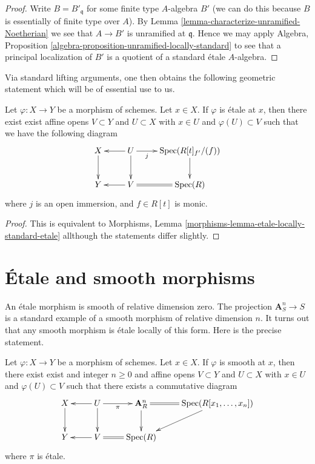\begin{proof}
Write $B = B'_{\mathfrak q}$ for some finite type $A$-algebra $B'$
(we can do this because $B$ is essentially of finite type over $A$).
By Lemma \ref{lemma-characterize-unramified-Noetherian}
we see that $A \to B'$ is unramified at $\mathfrak q$.
Hence we may apply
Algebra, Proposition \ref{algebra-proposition-unramified-locally-standard}
to see that a principal localization of $B'$ is a quotient of a
standard \'etale $A$-algebra.
\end{proof}

\noindent
Via standard lifting arguments, one then obtains the following geometric
statement which will be of essential use to us.

\begin{theorem}
\label{theorem-geometric-structure}
Let $\varphi : X \to Y$ be a morphism of schemes.
Let $x \in X$.
If $\varphi$ is \'etale at $x$, then there exist exist affine opens
$V \subset Y$ and $U \subset X$ with $x \in U$ and $\varphi(U) \subset V$
such that we have the following diagram
$$
\xymatrix{
X \ar[d] & U \ar[l] \ar[d] \ar[r]_-j & \text{Spec}(R[t]_{f'}/(f)) \ar[d] \\
Y & V \ar[l] \ar@{=}[r] & \text{Spec}(R)
}
$$
where $j$ is an open immersion, and $f \in R[t]$ is monic.
\end{theorem}

\begin{proof}
This is equivalent to
Morphisms, Lemma \ref{morphisms-lemma-etale-locally-standard-etale}
allthough the statements differ slightly.
\end{proof}


\section{\'Etale and smooth morphisms}
\label{section-etale-smooth}

\noindent
An \'etale morphism is smooth of relative dimension zero.
The projection $\mathbf{A}^n_S \to S$ is a standard example
of a smooth morphism of relative dimension $n$.
It turns out that any smooth morphism is \'etale locally
of this form. Here is the precise statement.

\begin{theorem}
\label{theorem-smooth-etale-over-n-space}
Let $\varphi : X \to Y$ be a morphism of schemes.
Let $x \in X$.
If $\varphi$ is smooth at $x$, then
there exist exist and integer $n \geq 0$ and affine opens
$V \subset Y$ and $U \subset X$ with $x \in U$ and $\varphi(U) \subset V$
such that there exists a commutative diagram
$$
\xymatrix{
X \ar[d] & U \ar[l] \ar[d] \ar[r]_-\pi &
\mathbf{A}^n_R \ar[d] \ar@{=}[r] &  \text{Spec}(R[x_1, \ldots, x_n]) \ar[dl] \\
Y & V \ar[l] \ar@{=}[r] & \text{Spec}(R)
}
$$
where $\pi$ is \'etale.
\end{theorem}

